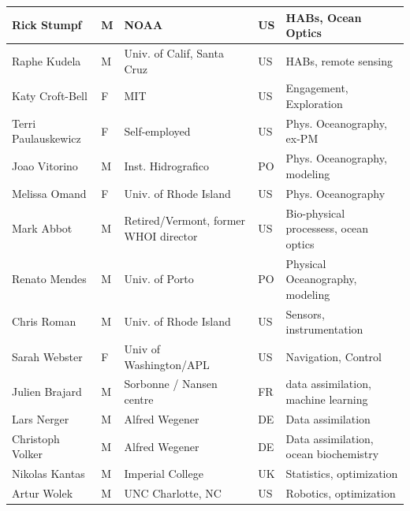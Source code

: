 \begin{table}[H]
{\begin{tabular}{|p{3cm}|p{0.5cm}|p{3.5cm}|p{0.5cm}|p{6cm}|}
\hline
Rick Stumpf              & M   & NOAA                                  & US       & HABs, Ocean Optics                              \\
\hline
Raphe Kudela             & M   & Univ. of Calif, Santa Cruz            & US       & HABs, remote sensing                            \\
\hline
Katy Croft-Bell          & F   & MIT                                   & US       & Engagement, Exploration                         \\
\hline
Terri Paulauskewicz      & F   & Self-employed                         & US       & Phys. Oceanography, ex-PM                       \\
\hline
Joao Vitorino            & M   & Inst. Hidrografico                    & PO       & Phys. Oceanography, modeling                    \\
\hline
Melissa Omand            & F   & Univ. of Rhode Island                 & US       & Phys. Oceanography                              \\
\hline
Mark Abbot               & M   & Retired/Vermont, former WHOI director & US       & Bio-physical processess, ocean optics           \\
\hline
Renato Mendes            & M   & Univ. of Porto                        & PO       & Physical Oceanography, modeling                 \\
\hline
Chris Roman              & M   & Univ. of Rhode Island                 & US       & Sensors, instrumentation                        \\
\hline
Sarah Webster            & F   & Univ of Washington/APL                & US       & Navigation, Control                             \\
\hline
Julien Brajard           & M   & Sorbonne / Nansen centre              & FR       & data assimilation, machine learning             \\
\hline
Lars Nerger              & M   & Alfred Wegener                        & DE       & Data assimilation                               \\
\hline
Christoph Volker         & M   & Alfred Wegener                        & DE       & Data assimilation, ocean biochemistry           \\
\hline
Nikolas Kantas           & M   & Imperial College                      & UK       & Statistics, optimization                        \\
\hline
Artur Wolek              & M   & UNC Charlotte, NC                     & US       & Robotics, optimization                          \\

\end{tabular}}
\end{table}
